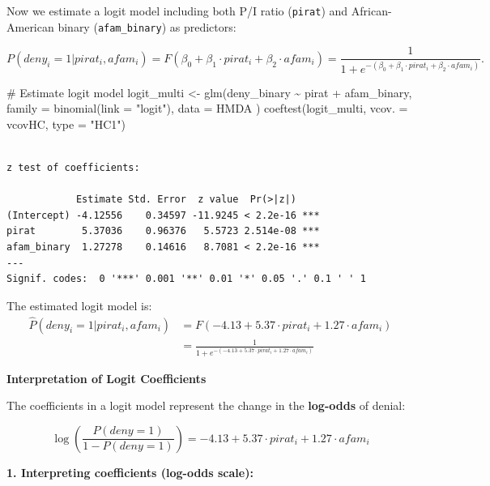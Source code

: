 \documentclass[
  12pt,
  letterpaper,
]{scrbook}
\newenvironment{Shaded}{\begin{snugshade}}{\end{snugshade}}
\newcommand{\AttributeTok}[1]{\textcolor[rgb]{0.40,0.45,0.13}{#1}}
\newcommand{\CommentTok}[1]{\textcolor[rgb]{0.37,0.37,0.37}{#1}}
\newcommand{\FunctionTok}[1]{\textcolor[rgb]{0.28,0.35,0.67}{#1}}
\newcommand{\NormalTok}[1]{\textcolor[rgb]{0.00,0.23,0.31}{#1}}
\newcommand{\OtherTok}[1]{\textcolor[rgb]{0.00,0.23,0.31}{#1}}
\newcommand{\SpecialCharTok}[1]{\textcolor[rgb]{0.37,0.37,0.37}{#1}}
\newcommand{\StringTok}[1]{\textcolor[rgb]{0.13,0.47,0.30}{#1}}
\theoremstyle{definition}
\theoremstyle{plain}
\theoremstyle{remark}
\begin{document}
Now we estimate a logit model including both P/I ratio (\texttt{pirat})
and African-American binary (\texttt{afam\_binary}) as predictors:

\[
P(deny_i = 1 | pirat_i, afam_i) = F(\beta_0 + \beta_1 \cdot pirat_i + \beta_2 \cdot afam_i) = \frac{1}{1 + e^{-(\beta_0 + \beta_1 \cdot pirat_i + \beta_2 \cdot afam_i)}} .
\]

\begin{Shaded}
\begin{Highlighting}[]
\CommentTok{\# Estimate logit model}
\NormalTok{logit\_multi }\OtherTok{\textless{}{-}} \FunctionTok{glm}\NormalTok{(deny\_binary }\SpecialCharTok{\textasciitilde{}}\NormalTok{ pirat }\SpecialCharTok{+}\NormalTok{ afam\_binary,}
    \AttributeTok{family =} \FunctionTok{binomial}\NormalTok{(}\AttributeTok{link =} \StringTok{"logit"}\NormalTok{),}
    \AttributeTok{data =}\NormalTok{ HMDA}
\NormalTok{)}
\FunctionTok{coeftest}\NormalTok{(logit\_multi, }\AttributeTok{vcov. =}\NormalTok{ vcovHC, }\AttributeTok{type =} \StringTok{"HC1"}\NormalTok{)}
\end{Highlighting}
\end{Shaded}

\begin{verbatim}

z test of coefficients:

            Estimate Std. Error  z value  Pr(>|z|)    
(Intercept) -4.12556    0.34597 -11.9245 < 2.2e-16 ***
pirat        5.37036    0.96376   5.5723 2.514e-08 ***
afam_binary  1.27278    0.14616   8.7081 < 2.2e-16 ***
---
Signif. codes:  0 '***' 0.001 '**' 0.01 '*' 0.05 '.' 0.1 ' ' 1
\end{verbatim}

The estimated logit model is: \[
\begin{split}
\widehat{P}(deny_i = 1 | pirat_i, afam_i) &= F(-4.13 + 5.37 \cdot pirat_i + 1.27 \cdot afam_i) \\
&= \frac{1}{1 + e^{-(-4.13 + 5.37 \cdot pirat_i + 1.27 \cdot afam_i)}}
\end{split}
\]

{\textbf{Interpretation of Logit Coefficients}}

The coefficients in a logit model represent the change in the
\textbf{log-odds} of denial:

\[
\log\left(\frac{P(deny = 1)}{1 - P(deny = 1)}\right) = -4.13 + 5.37 \cdot pirat_i + 1.27 \cdot afam_i
\]

\textbf{1. Interpreting coefficients (log-odds scale):}
\end{document}
